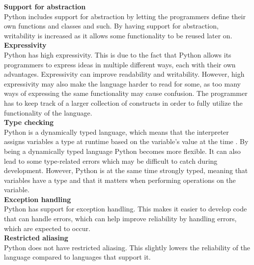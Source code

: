 \noindent\textbf{Support for abstraction}\\
\noindent Python includes support for abstraction by letting the programmers define their own functions and classes and such. By having support for abstraction, writability is increased as it allows some functionality to be reused later on.\\

\noindent\textbf{Expressivity}\\
\noindent Python has high expressivity. This is due to the fact that Python allows its programmers to express ideas in multiple different ways, each with their own advantages. Expressivity can improve readability and writability. However, high expressivity may also make the language harder to read for some, as too many ways of expressing the same functionality may cause confusion. The programmer has to keep track of a larger collection of constructs in order to fully utilize the functionality of the language.\\

\noindent\textbf{Type checking}\\
\noindent Python is a dynamically typed language, which means that the interpreter assigns variables a type at runtime based on the variable's value at the time \cite{Dynamic_Typing}. By being a dynamically typed language Python becomes more flexible. It can also lead to some type-related errors which may be difficult to catch during development. However, Python is at the same time strongly typed, meaning that variables have a type and that it matters when performing operations on the variable.\\

\noindent\textbf{Exception handling}\\
\noindent Python has support for exception handling. This makes it easier to develop code that can handle errors, which can help improve reliability by handling errors, which are expected to occur.\\

\noindent\textbf{Restricted aliasing}\\
\noindent Python does not have restricted aliasing. This slightly lowers the reliability of the language compared to languages that support it.



